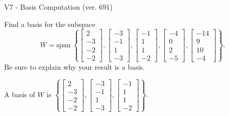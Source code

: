 \begin{exercise}
  \begin{exerciseTitle}V7 - Basis Computation (ver. 691)\end{exerciseTitle}
  \begin{exerciseStatement}
    Find a basis for the subspace 
\[W=\mathrm{span}\ \left\{\left[\begin{array}{r}
2 \\
-3 \\
-2 \\
-2
\end{array}\right] , \left[\begin{array}{r}
-3 \\
-1 \\
1 \\
-3
\end{array}\right] , \left[\begin{array}{r}
-1 \\
1 \\
1 \\
-2
\end{array}\right] , \left[\begin{array}{r}
-4 \\
0 \\
2 \\
-5
\end{array}\right] , \left[\begin{array}{r}
-14 \\
9 \\
10 \\
-4
\end{array}\right]\right\}.\]
 Be sure to explain why your result is a basis.


  \end{exerciseStatement}
  \begin{exerciseAnswer}
   A basis of \(W\) is  \(\left\{\left[\begin{array}{r}
2 \\
-3 \\
-2 \\
-2
\end{array}\right] , \left[\begin{array}{r}
-3 \\
-1 \\
1 \\
-3
\end{array}\right] , \left[\begin{array}{r}
-1 \\
1 \\
1 \\
-2
\end{array}\right]\right\}\).
  


  \end{exerciseAnswer}
\end{exercise}